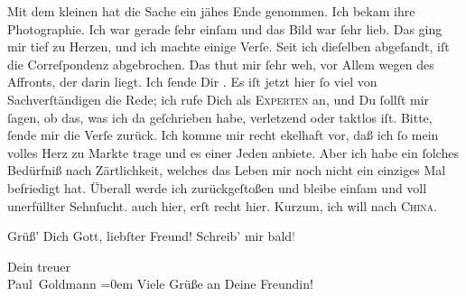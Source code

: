 \pstart
           {\pb}Mit dem kleinen \label{K_L02836-5v}\label{K_L02836-5} hat die Sache ein jähes Ende genommen. Ich bekam ihre Photographie. Ich war
               gerade ſehr einſam und das Bild war ſehr lieb. Das ging mir tief zu Herzen, und ich
               machte einige Verſe. Seit ich dieſelben abgeſandt, iſt die Correſpondenz abgebrochen.
               Das thut mir ſehr weh, \strikeout{\textcolor{gray}{v}} vor Allem wegen des Affronts, der darin liegt. Ich ſende Dir \label{K_L02836-6v}\label{K_L02836-6}. Es iſt jetzt hier ſo viel von
               Sachverſtändigen die Rede; ich rufe Dich als \textsc{Experten} an,
               und Du ſollſt mir ſagen, ob das, was ich da geſchrieben habe, verletzend oder taktlos
               iſt. Bitte, ſende mir die Verſe zurück. Ich komme mir recht ekelhaft vor, daß ich ſo
               mein volles Herz zu Markte trage und es einer Jeden anbiete. Aber ich habe ein
               ſolches {\pb}Bedürfniß nach Zärtlichkeit, welches das
               Leben mir noch nicht ein einziges Mal befriedigt hat. Überall werde ich
               zurückgeſtoßen und bleibe einſam und voll unerfüllter Sehnſucht. \label{K_L02836-7v}\label{K_L02836-7} auch hier,
               erſt recht hier. Kurzum, ich will nach \textsc{China}.\pend
           
\pstart
           Grüß’ Dich Gott, liebſter Freund! Schreib’ mir bald\textcolor{gray}{!}\pend
           
\pstart
           Dein treuer {\\[\baselineskip]}\spacefill\mbox{Paul Goldmann}\pend
           \leftskip=0em{}
\pstart
           \noindent{}Viele Grüße an Deine Freundin!\pend
           \endnumbering{}  
      